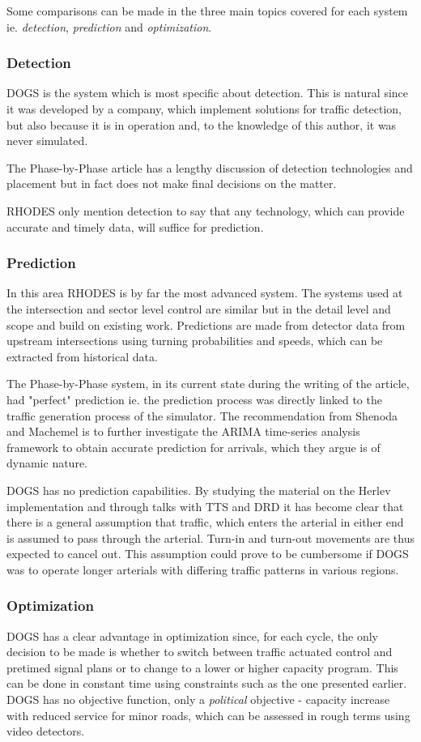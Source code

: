 Some comparisons can be made in the three main topics covered for each system ie. \textit{detection}, \textit{prediction} and \textit{optimization}.

\subsubsection*{Detection}
DOGS is the system which is most specific about detection. This is natural since it was developed by a company, which implement solutions for traffic detection, but also because it is in operation and, to the knowledge of this author, it was never simulated.

The Phase-by-Phase article has a lengthy discussion of detection technologies and placement but in fact does not make final decisions on the matter.

RHODES only mention detection to say that any technology, which can provide accurate and timely data, will suffice for prediction.

\subsubsection*{Prediction}
In this area RHODES is by far the most advanced system. The systems used at the intersection and sector level control are similar but in the detail level and scope and build on existing work. Predictions are made from detector data from upstream intersections using turning probabilities and speeds, which can be extracted from historical data.

The Phase-by-Phase system, in its current state during the writing of the article, had "perfect" prediction ie. the prediction process was directly linked to the traffic generation process of the simulator. The recommendation from Shenoda and Machemel is to further investigate the ARIMA time-series analysis framework to obtain accurate prediction for arrivals, which they argue is of dynamic nature.

DOGS has no prediction capabilities. By studying the material on the Herlev implementation and through talks with TTS and DRD it has become clear that there is a general assumption that traffic, which enters the arterial in either end is assumed to pass through the arterial. Turn-in and turn-out movements are thus expected to cancel out. This assumption could prove to be cumbersome if DOGS was to operate longer arterials with differing traffic patterns in various regions.

\subsubsection*{Optimization}
DOGS has a clear advantage in optimization since, for each cycle, the only decision to be made is whether to switch between traffic actuated control and pretimed signal plans or to change to a lower or higher capacity program. This can be done in constant time using constraints such as the one presented earlier. DOGS has no objective function, only a \textit{political} objective - capacity increase with reduced service for minor roads, which can be assessed in rough terms using video detectors.

